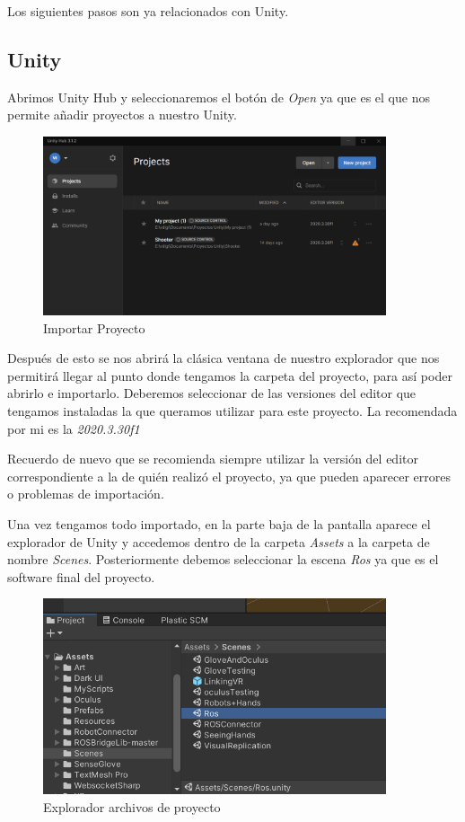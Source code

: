 Los siguientes pasos son ya relacionados con Unity.
\newpage
\subsection{Unity}
Abrimos Unity Hub y seleccionaremos el botón de \textit{Open} ya que es el que nos permite añadir proyectos a nuestro Unity. 

   \begin{figure}[h]
\centering
\label{Importar Proyecto}
\includegraphics[width=0.9\textwidth]{img/hub3.PNG}
\caption{Importar Proyecto}
\end{figure}

Después de esto se nos abrirá la clásica ventana de nuestro explorador que nos permitirá llegar al punto donde tengamos la carpeta del proyecto, para así poder abrirlo e importarlo. Deberemos seleccionar de las versiones del editor que tengamos instaladas la que queramos utilizar para este proyecto. La recomendada por mi es la \textit{2020.3.30f1}

Recuerdo de nuevo que se recomienda siempre utilizar la versión del editor correspondiente a la de quién realizó el proyecto, ya que pueden aparecer errores o problemas de importación.

\newpage
Una vez tengamos todo importado, en la parte baja de la pantalla aparece el explorador de Unity y accedemos dentro de la carpeta \textit{Assets} a la carpeta de nombre \textit{Scenes}. Posteriormente debemos seleccionar la escena \textit{Ros} ya que es el software final del proyecto.

   \begin{figure}[h]
\centering
\label{Explorador archivos de proyecto}
\includegraphics[width=0.9\textwidth]{img/inst1.PNG}
\caption{Explorador archivos de proyecto}
\end{figure}

